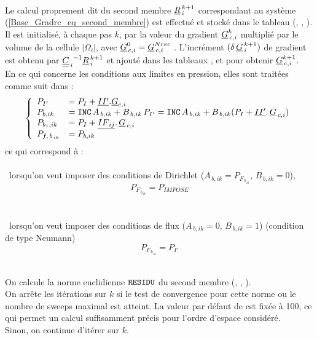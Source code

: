 {\\
Le calcul proprement dit du second membre ${\underline{R}^{\,k+1}_{\,i}} $
correspondant au syst\`eme (\ref{Base_Gradrc_eq_second_membre}) est effectu\'e et stock\'e
dans le tableau (, , ). Il est initialis\'e, \`a chaque
pas $k$, par la
valeur du gradient $\underline{G}^{k}_{\,c,i}$ multipli\'e par le
volume de la cellule $|\Omega_i|$, avec $\underline{G}^{0}_{\,c,i} = \underline{G}^{Nrec}_{\,c,i}$ . L'incr\'ement $(\delta\,\underline{G}^{\,k+1}_{\,i})$
de gradient est obtenu par $ {\underline{\underline{C}}_{\,i}}^{-1}{\underline{R}^{\,k+1}_{\,i}}$ et
ajout\'e dans les tableaux ,
 et  pour obtenir $\underline{G}^{k+1}_{\,c,i}$.\\

En ce qui concerne les conditions aux limites en pression, elles sont
trait\'ees comme suit dans \CS :
\begin{equation}\notag
\left\{\begin{array}{llll}
P_{I'}&=P_{I}+\underline{II'}.\underline{G}_{c,i}\\
P_{b,ik}& =\text{\texttt{INC}}\,A_{\,b,ik} + B_{\,b,ik}\,P_{I'} = \text{\texttt{INC}}\,A_{\,b,ik} + B_{\,b,ik}(P_{I}+\underline{II'}.\,\underline{G}_{\,c,i}) \\
P_{b_{1},ik}&= P_{I}+\underline{I{F_{\,ij}}}.\,\underline{G}_{\,c,i}\\
P_{f,\,b_{\,ik}}&= P_{b,ik}
\end{array}\right.
\end{equation}
ce qui correspond \`a :\\\\
\hspace*{1cm}{\tiny$\blacksquare$}\, lorsqu'on veut imposer des conditions de Dirichlet ($A_{\,b,ik} =
P_{F_{\,b_{\,ik}}}$, $B_{\,b,ik} = 0$),
\begin{equation}
P_{F_{\,b_{\,ik}}}  = P_{IMPOSE}
\end{equation}
\\\\
\hspace*{1cm}{\tiny$\blacksquare$}\, lorsqu'on veut imposer des conditions de
flux ($A_{\,b,ik} = 0$, $B_{\,b,ik} = 1$) (condition de type Neumann)
\begin{equation}
P_{F_{\,b_{\,ik}}}  = P_{I'}
\end{equation}

\hspace*{1,5cm}{\bf Test de convergence de la m\'ethode it\'erative de r\'esolution}\\
On calcule la norme euclidienne $\text{\texttt{RESIDU}}$ du second membre (,
, ).\\
On arr\^ete les it\'erations sur $k$ si le test de
convergence pour cette norme ou le nombre de
sweeps maximal  est atteint. La valeur par d\'efaut de   est fix\'ee \`a 100, ce
qui permet un calcul suffisamment pr\'ecis pour l'ordre d'espace
consid\'er\'e.\\
Sinon, on continue d'it\'erer sur $k$.
}
